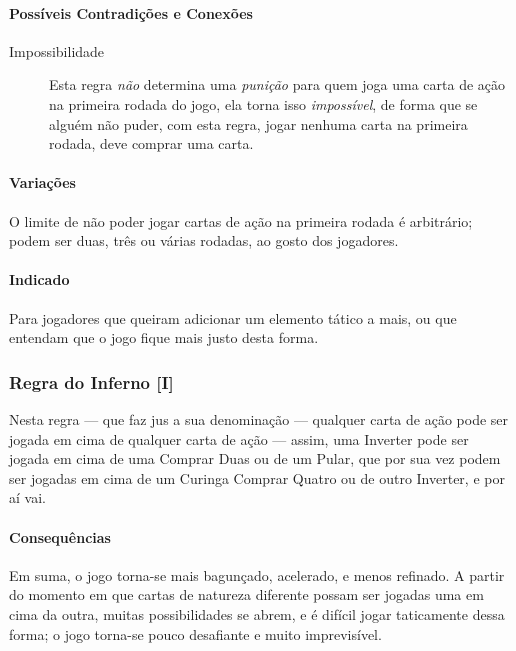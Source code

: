 \paragraph{Possíveis Contradições e Conexões}

\begin{description}
\item[Impossibilidade]{Esta regra \emph{não} determina uma \emph{punição} para quem joga uma carta de ação na primeira rodada do jogo, ela torna isso \emph{impossível}, de forma que se alguém não puder, com esta regra, jogar nenhuma carta na primeira rodada, deve comprar uma carta.}
\end{description}

\paragraph{Variações}

O limite de não poder jogar cartas de ação na primeira rodada é arbitrário; podem ser duas, três ou várias rodadas, ao gosto dos jogadores.

\paragraph{Indicado} 

Para jogadores que queiram adicionar um elemento tático a mais, ou que entendam que o jogo fique mais justo desta forma.

\subsubsection{Regra do Inferno [I]}

Nesta regra --- que faz jus a sua denominação --- qualquer carta de ação pode ser jogada em cima de qualquer carta de ação --- assim, uma Inverter pode ser jogada em cima de uma Comprar Duas ou de um Pular, que por sua vez podem ser jogadas em cima de um Curinga Comprar Quatro ou de outro Inverter, e por aí vai.

\paragraph{Consequências}

Em suma, o jogo torna-se mais bagunçado, acelerado, e menos refinado. A partir do momento em que cartas de natureza diferente possam ser jogadas uma em cima da outra, muitas possibilidades se abrem, e é difícil jogar taticamente dessa forma; o jogo torna-se pouco desafiante e muito imprevisível.

